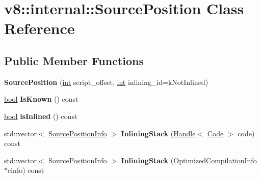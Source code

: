 \hypertarget{classv8_1_1internal_1_1SourcePosition}{}\section{v8\+:\+:internal\+:\+:Source\+Position Class Reference}
\label{classv8_1_1internal_1_1SourcePosition}
\subsection*{Public Member Functions}
\begin{DoxyCompactItemize}
\item 
\mbox{\label{classv8_1_1internal_1_1SourcePosition_af0e99702f968696eb00b053940c27c3d}} 
{\bfseries Source\+Position} (\mbox{\hyperlink{classint}{int}} script\+\_\+offset, \mbox{\hyperlink{classint}{int}} inlining\+\_\+id=k\+Not\+Inlined)
\item 
\mbox{\label{classv8_1_1internal_1_1SourcePosition_ac7845ddff63e1b193c963c60d743f0be}} 
\mbox{\hyperlink{classbool}{bool}} {\bfseries Is\+Known} () const
\item 
\mbox{\label{classv8_1_1internal_1_1SourcePosition_a5270439ccccef04f79f86b6387f3755b}} 
\mbox{\hyperlink{classbool}{bool}} {\bfseries is\+Inlined} () const
\item 
\mbox{\label{classv8_1_1internal_1_1SourcePosition_a971ea498185d3fe8788739d5002e33f7}} 
std\+::vector$<$ \mbox{\hyperlink{structv8_1_1internal_1_1SourcePositionInfo}{Source\+Position\+Info}} $>$ {\bfseries Inlining\+Stack} (\mbox{\hyperlink{classv8_1_1internal_1_1Handle}{Handle}}$<$ \mbox{\hyperlink{classv8_1_1internal_1_1Code}{Code}} $>$ code) const
\item 
\mbox{\label{classv8_1_1internal_1_1SourcePosition_a1d4705a4df0f0c16c8df90647f84ed79}} 
std\+::vector$<$ \mbox{\hyperlink{structv8_1_1internal_1_1SourcePositionInfo}{Source\+Position\+Info}} $>$ {\bfseries Inlining\+Stack} (\mbox{\hyperlink{classv8_1_1internal_1_1OptimizedCompilationInfo}{Optimized\+Compilation\+Info}} $\ast$cinfo) const
\item 

\end{DoxyCompactItemize}
